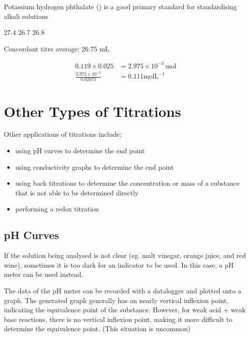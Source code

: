 	Potassium hydrogen phthalate () is a good primary standard for standardising alkali solutions

	\begin{center}
	\end{center}


	27.4
	26.7
	26.8

	Concordant titre average: 26.75 mL

	\begin{align*}
		0.119 \times 0.025 &= 2.975 \times 10^{-3} \, \text{mol} \\
		\frac{2.975 \times 10^{-3}}{0.02675} &= 0.111 \text{molL}^{-1}
	\end{align*}

\section{Other Types of Titrations} \label{17/03/2025}


	Other applications of titrations include:

	\begin{itemize}
		\item using pH curves to determine the end point
		\item using conductivity graphs to determine the end point
		\item using back titrations to determine the concentration or mass of a substance that is not able to be determined directly
		\item performing a redox titration
	\end{itemize}


	\subsection{pH Curves}

		If the solution being analysed is not clear (eg. malt vinegar, orange juice, and red wine), sometimes it is too dark for an indicator to be used. In this case, a pH meter can be used instead.

		The data of the pH meter can be recorded with a datalogger and plotted onto a graph. The generated graph generally has an nearly vertical inflexion point, indicating the equivalence point of the substance. However, for weak acid + weak base reactions, there is no vertical inflexion point, making it more difficult to determine the equivalence point. (This situation is uncommon)

